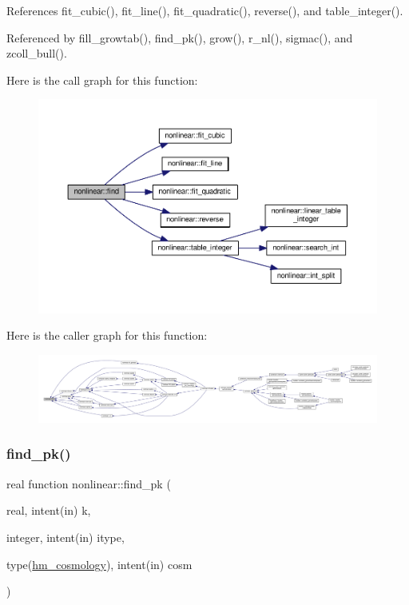 References fit\+\_\+cubic(), fit\+\_\+line(), fit\+\_\+quadratic(), reverse(), and table\+\_\+integer().



Referenced by fill\+\_\+growtab(), find\+\_\+pk(), grow(), r\+\_\+nl(), sigmac(), and zcoll\+\_\+bull().

Here is the call graph for this function\+:
\nopagebreak
\begin{figure}[H]
\begin{center}
\leavevmode
\includegraphics[width=350pt]{namespacenonlinear_a553c7b86e3fd7c044f3fcef5b77c0a3f_cgraph}
\end{center}
\end{figure}
Here is the caller graph for this function\+:
\nopagebreak
\begin{figure}[H]
\begin{center}
\leavevmode
\includegraphics[width=350pt]{namespacenonlinear_a553c7b86e3fd7c044f3fcef5b77c0a3f_icgraph}
\end{center}
\end{figure}
\mbox{\label{namespacenonlinear_ad7792185b1262569016446c4cba41606}} 
\subsubsection{\texorpdfstring{find\+\_\+pk()}{find\_pk()}}
{\footnotesize\ttfamily real function nonlinear\+::find\+\_\+pk (\begin{DoxyParamCaption}\item[{real, intent(in)}]{k,  }\item[{integer, intent(in)}]{itype,  }\item[{type(\mbox{\hyperlink{structnonlinear_1_1hm__cosmology}{hm\+\_\+cosmology}}), intent(in)}]{cosm }\end{DoxyParamCaption})\hspace{0.3cm}{\ttfamily [private]}}



